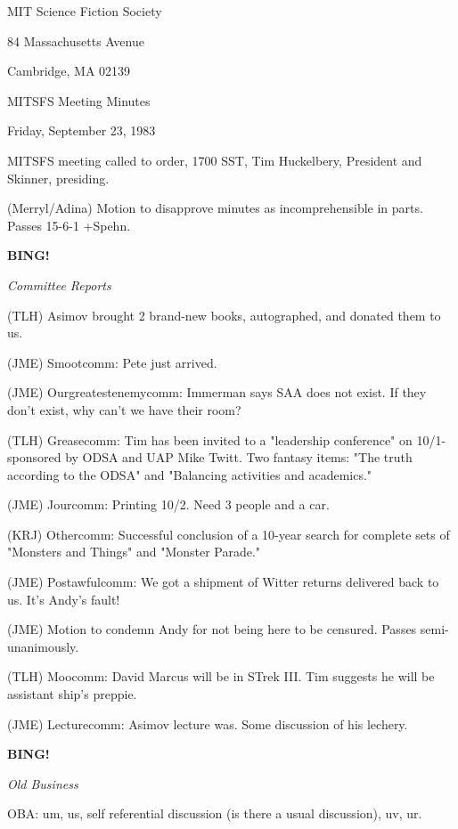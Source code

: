 \documentclass[12pt]{article}
\newcommand{\bing}{{\bf BING!} }
\newcommand{\goto}[1]{\bing \vskip 12pt \centerline{{\em{#1}}}}
\begin{document}
\begin{center}

MIT Science Fiction Society 

84 Massachusetts Avenue

Cambridge, MA 02139

\vspace{12pt}

MITSFS Meeting Minutes 

Friday, September 23, 1983

\end{center}
 
\vspace{18pt}

\setlength{\parskip}{6pt}

\noindent
MITSFS meeting called to order, 1700 SST,
Tim Huckelbery, President and Skinner, presiding.

(Merryl/Adina) Motion to disapprove minutes as incomprehensible in parts. Passes 15-6-1 +Spehn.

\goto{Committee Reports}

(TLH) Asimov brought 2 brand-new books, autographed, and donated them to us.

(JME) Smootcomm: Pete just arrived.

(JME) Ourgreatestenemycomm: Immerman says SAA does not exist. If they don't exist, why can't we have their room?

(TLH) Greasecomm: Tim has been invited to a "leadership conference" on 10/1- sponsored by ODSA and UAP Mike Twitt. Two fantasy items: "The truth according to the ODSA" and "Balancing activities and academics."

(JME) Jourcomm: Printing 10/2. Need 3 people and a car.

(KRJ) Othercomm: Successful conclusion of a 10-year search for complete sets of "Monsters and Things" and "Monster Parade."

(JME) Postawfulcomm: We got a shipment of Witter returns delivered back to us. It's Andy's fault!

(JME) Motion to condemn Andy for not being here to be censured. Passes semi-unanimously.

(TLH) Moocomm: David Marcus will be in STrek III. Tim suggests he will be assistant ship's preppie.

(JME) Lecturecomm: Asimov lecture was. Some discussion of his lechery.

\goto{Old Business}

OBA: um, us, self referential discussion (is there a usual discussion), uv, ur.
\end{document}
